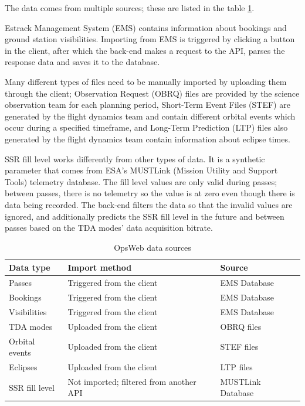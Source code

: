 The data comes from multiple sources; these are listed in the table \ref{tab:opsweb_data_sources}.

Estrack Management System (EMS) contains information about bookings and ground station visibilities. Importing from EMS is triggered by clicking a button in the client, after which the back-end makes a request to the API, parses the response data and saves it to the database.

Many different types of files need to be manually imported by uploading them through the client; Observation Request (OBRQ) files are provided by the science observation team for each planning period, Short-Term Event Files (STEF) are generated by the flight dynamics team and contain different orbital events which occur during a specified timeframe, and Long-Term Prediction (LTP) files also generated by the flight dynamics team contain information about eclipse times.

SSR fill level works differently from other types of data. It is a synthetic parameter that comes from ESA's MUSTLink (Mission Utility and Support Tools) telemetry database. The fill level values are only valid during passes; between passes, there is no telemetry so the value is at zero even though there is data being recorded. The back-end filters the data so that the invalid values are ignored, and additionally predicts the SSR fill level in the future and between passes based on the TDA modes' data acquisition bitrate.

\begin{table}[!ht]
\def\arraystretch{1.1}%
\begin{center}
  \caption{OpsWeb data sources}
  \label{tab:opsweb_data_sources}
  \begin{tabular}{| l | l | l | }
    \hline
    Data type & Import method & Source \\
    \hline
    Passes & Triggered from the client & EMS Database  \\
    Bookings & Triggered from the client & EMS Database  \\
    Visibilities & Triggered from the client & EMS Database  \\
    TDA modes & Uploaded from the client & OBRQ files  \\
    Orbital events & Uploaded from the client & STEF files \\
    Eclipses & Uploaded from the client & LTP files \\
    SSR fill level & Not imported; filtered from another API & MUSTLink Database \\
    \hline
  \end{tabular}

  \end{center}
\end{table}

